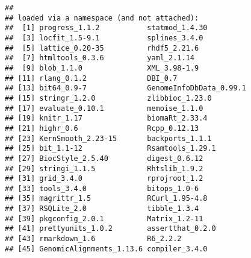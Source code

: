 \documentclass{report}\usepackage[]{graphicx}\usepackage[usenames,dvipsnames]{color}
\newenvironment{knitrout}{}{} %
\begin{document}
\begin{knitrout}
\begin{kframe}
\begin{verbatim}
## 
## loaded via a namespace (and not attached):
##  [1] progress_1.1.2           statmod_1.4.30          
##  [3] locfit_1.5-9.1           splines_3.4.0           
##  [5] lattice_0.20-35          rhdf5_2.21.6            
##  [7] htmltools_0.3.6          yaml_2.1.14             
##  [9] blob_1.1.0               XML_3.98-1.9            
## [11] rlang_0.1.2              DBI_0.7                 
## [13] bit64_0.9-7              GenomeInfoDbData_0.99.1 
## [15] stringr_1.2.0            zlibbioc_1.23.0         
## [17] evaluate_0.10.1          memoise_1.1.0           
## [19] knitr_1.17               biomaRt_2.33.4          
## [21] highr_0.6                Rcpp_0.12.13            
## [23] KernSmooth_2.23-15       backports_1.1.1         
## [25] bit_1.1-12               Rsamtools_1.29.1        
## [27] BiocStyle_2.5.40         digest_0.6.12           
## [29] stringi_1.1.5            Rhtslib_1.9.2           
## [31] grid_3.4.0               rprojroot_1.2           
## [33] tools_3.4.0              bitops_1.0-6            
## [35] magrittr_1.5             RCurl_1.95-4.8          
## [37] RSQLite_2.0              tibble_1.3.4            
## [39] pkgconfig_2.0.1          Matrix_1.2-11           
## [41] prettyunits_1.0.2        assertthat_0.2.0        
## [43] rmarkdown_1.6            R6_2.2.2                
## [45] GenomicAlignments_1.13.6 compiler_3.4.0
\end{verbatim}
\end{kframe}
\end{knitrout}


\end{document}
